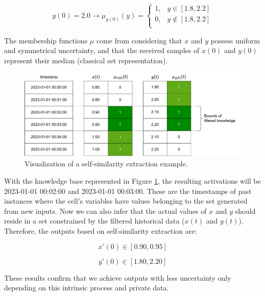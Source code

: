 \begin{equation}
    y(0) = 2.0 \rightarrow \mu_{y(0)}(y) =
    \begin{cases}
        1, & y \in [1.8, 2.2]    \\
        0, & y \notin [1.8, 2.2] \\
    \end{cases}
\end{equation}

The membership functions $\mu$ come from considering that $x$ and $y$ possess uniform and symmetrical uncertainty, and that the received samples of $x(0)$ and $y(0)$ represent their median (classical set representation).

\begin{figure}[h!]
    \centering
    \includegraphics[width=\linewidth]{figures/chapter4/cell/solo_state_estimation.pdf}
    \caption{Visualization of a self-similarity extraction example.}
    \label{fig:solo_state_estimation}
\end{figure}


With the knowledge base represented in Figure \ref{fig:solo_state_estimation}, the resulting activations will be 2023-01-01 00:02:00 and 2023-01-01 00:03:00. These are the timestamps of past instances where the cell's variables have values belonging to the set generated from new inputs. Now we can also infer that the actual values of $x$ and $y$ should reside in a set constrained by the filtered historical data ($x(t)$ and $y(t)$). Therefore, the outputs based on self-similarity extraction are:

\begin{equation}
    x'(0) \in [0.90, 0.95]
\end{equation}

\begin{equation}
    y'(0) \in [1.80, 2.20]
\end{equation}

These results confirm that we achieve outputs with less uncertainty only depending on this intrinsic process and private data.


